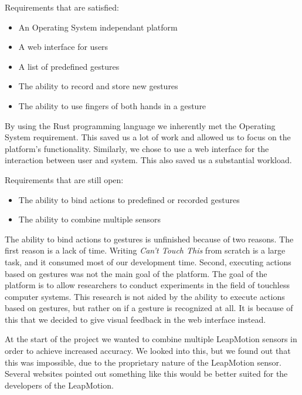 \documentclass[a4paper]{article}
\providecommand{\tightlist}{%
\setlength{\itemsep}{0pt}\setlength{\parskip}{0pt}}
\begin{document}
  Requirements that are satisfied: 
  \begin{itemize}
    \tightlist
    \item An Operating System independant platform
    \item A web interface for users
    \item A list of predefined gestures
    \item The ability to record and store new gestures
    \item The ability to use fingers of both hands in a gesture
  \end{itemize}
  By using the Rust programming language we inherently met the Operating System
  requirement. This saved us a lot of work and allowed us to focus on the
  platform's functionality. Similarly, we chose to use a web interface for the
  interaction between user and system. This also saved us a substantial
  workload.

  Requirements that are still open:
  \begin{itemize}
    \tightlist
    \item The ability to bind actions to predefined or recorded gestures
    \item The ability to combine multiple sensors
  \end{itemize}
  The ability to bind actions to gestures is unfinished because of two reasons.
  The first reason is a lack of time. Writing \textit{Can't Touch This} from
  scratch is a large task, and it consumed most of our development time. Second,
  executing actions based on gestures was not the main goal of the platform. The
  goal of the platform is to allow researchers to conduct experiments in the
  field of touchless computer systems. This research is not aided by the ability
  to execute actions based on gestures, but rather on if a gesture is
  recognized at all. It is because of this that we decided to give visual
  feedback in the web interface instead.

  At the start of the project we wanted to combine multiple LeapMotion sensors
  in order to achieve increased accuracy. We looked into this, but we found out
  that this was impossible, due to the proprietary nature of the LeapMotion
  sensor. Several websites pointed out something like this would be better
  suited for the developers of the LeapMotion.
  \clearpage

\end{document}
